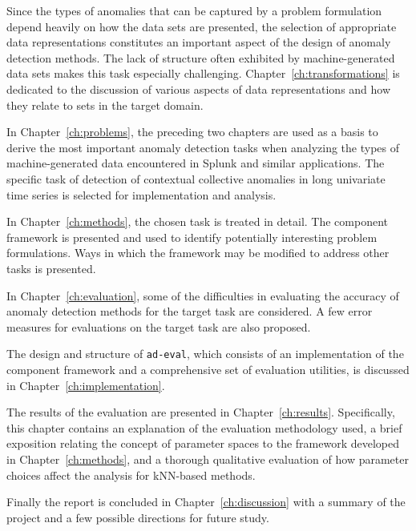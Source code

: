 Since the types of anomalies that can be captured by a problem formulation depend heavily on how the data sets are presented, the selection of appropriate data representations constitutes an important aspect of the design of anomaly detection methods. The lack of structure often exhibited by machine-generated data sets makes this task especially challenging. Chapter~\ref{ch:transformations} is dedicated to the discussion of various aspects of data representations and how they relate to sets in the target domain. 

In Chapter~\ref{ch:problems}, the preceding two chapters are used as a basis to derive the most important anomaly detection tasks when analyzing the types of machine-generated data encountered in Splunk and similar applications. The specific task of detection of contextual collective anomalies in long univariate time series is selected for implementation and analysis.

In Chapter~\ref{ch:methods}, the chosen task is treated in detail. The component framework is presented and used to identify potentially interesting problem formulations. Ways in which the framework may be modified to address other tasks is presented.

In Chapter~\ref{ch:evaluation}, some of the difficulties in evaluating the accuracy of anomaly detection methods for the target task are considered. A few error measures for evaluations on the target task are also proposed.

The design and structure of \texttt{ad-eval}, which consists of an implementation of the component framework and a comprehensive set of evaluation utilities, is discussed in Chapter~\ref{ch:implementation}.

The results of the evaluation are presented in Chapter~\ref{ch:results}. Specifically, this chapter contains an explanation of the evaluation methodology used, a brief exposition relating the concept of parameter spaces to the framework developed in Chapter~\ref{ch:methods}, and a thorough qualitative evaluation of how parameter choices affect the analysis for kNN-based methods. 

Finally the report is concluded in Chapter~\ref{ch:discussion} with a summary of the project and a few possible directions for future study.
